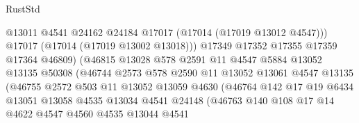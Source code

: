 \begin{lexlean}{RustStd}
\begin{coremodule}
                                    @13011
                                    @4541
                                    @24162
                                    @24184
                                    @17017
                                    (@17014 (@17019 @13012 @4547)))
                                  @17017
                                  (@17014 (@17019 @13002 @13018)))
                                @17349
                                @17352
                                @17355
                                @17359
                                @17364
                                @46809)
                              (@46815
                                @13028
                                @578
                                @2591
                                @11
                                @4547
                                @5884
                                @13052
                                @13135
                                @50308
                                (@46744
                                  @2573
                                  @578
                                  @2590
                                  @11
                                  @13052
                                  @13061
                                  @4547
                                  @13135
                                  (@46755
                                    @2572
                                    @503
                                    @11
                                    @13052
                                    @13059
                                    @4630
                                    (@46764
                                      @142
                                      @17
                                      @19
                                      @6434
                                      @13051
                                      @13058
                                      @4535
                                      @13034
                                      @4541
                                      @24148
                                      (@46763
                                        @140
                                        @108
                                        @17
                                        @14
                                        @4622
                                        @4547
                                        @4560
                                        @4535
                                        @13044
                                        @4541

\end{coremodule}
\end{lexlean}

